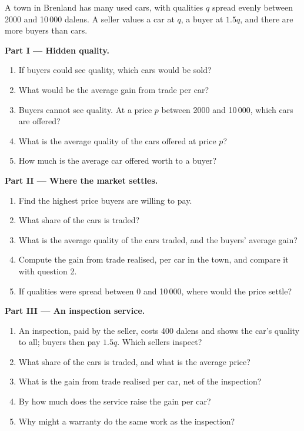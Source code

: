 \begin{problem}
\label{pb:g11:asymmetric-information:1}
A town in Brenland has many used cars, with qualities $q$ spread evenly between 2000 and 10\,000 dalens. A seller values a car at $q$, a buyer at $1.5q$, and there are more
buyers than cars.

\medskip
\noindent\textbf{Part I --- Hidden quality.}
\begin{enumerate}
\item If buyers could see quality, which cars would be sold?
\item What would be the average gain from trade per car?
\item Buyers cannot see quality. At a price $p$ between 2000 and 10\,000, which cars are offered?
\item What is the average quality of the cars offered at price $p$?
\item How much is the average car offered worth to a buyer?
\end{enumerate}

\medskip
\noindent\textbf{Part II --- Where the market settles.}
\begin{enumerate}[resume]
\item Find the highest price buyers are willing to pay.
\item What share of the cars is traded?
\item What is the average quality of the cars traded, and the buyers' average gain?
\item Compute the gain from trade realised, per car in the town, and compare it with question 2.
\item If qualities were spread between 0 and 10\,000, where would the price settle?
\end{enumerate}

\medskip
\noindent\textbf{Part III --- An inspection service.}
\begin{enumerate}[resume]
\item An inspection, paid by the seller, costs 400 dalens and shows the car's quality to all; buyers then pay $1.5q$. Which sellers inspect?
\item What share of the cars is traded, and what is the average price?
\item What is the gain from trade realised per car, net of the inspection?
\item By how much does the service raise the gain per car?
\item Why might a warranty do the same work as the inspection?
\end{enumerate}


\end{problem}
